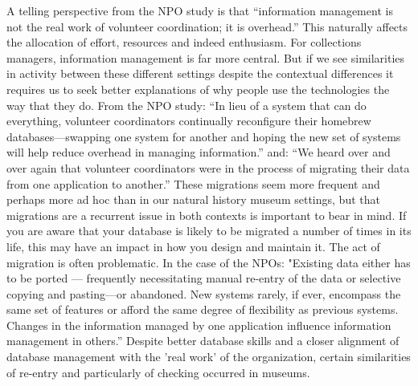 A telling perspective from the NPO study is that “information management is not the real work of volunteer coordination; it is overhead.” This naturally affects the allocation of effort, resources and indeed enthusiasm. For collections managers, information management is far more central. But if we see similarities in activity between these different settings despite the contextual differences it requires us to seek better explanations of why people use the technologies the way that they do. From the NPO study: “In lieu of a system that can do everything, volunteer coordinators continually reconfigure their homebrew databases—swapping one system for another and hoping the new set of systems will help reduce overhead in managing information.”  and: “We heard over and over again that volunteer coordinators were in the process of migrating their data from one application to another.” These migrations seem more frequent and perhaps more ad hoc than in our natural history museum settings, but that migrations are a recurrent issue in both contexts is important to bear in mind. If you are aware that your database is likely to be migrated a number of times in its life, this may have an impact in how you design and maintain it. The act of migration is often problematic. In the case of the NPOs: "Existing data either has to be ported — frequently necessitating manual re-entry of the data or selective copying and pasting—or abandoned. New systems rarely, if ever, encompass the same set of features or afford the same degree of flexibility as previous systems. Changes in the information managed by one application influence information management in others.” Despite better database skills and a closer alignment of database management with the 'real work' of the organization, certain similarities of re-entry and particularly of checking occurred in museums.


